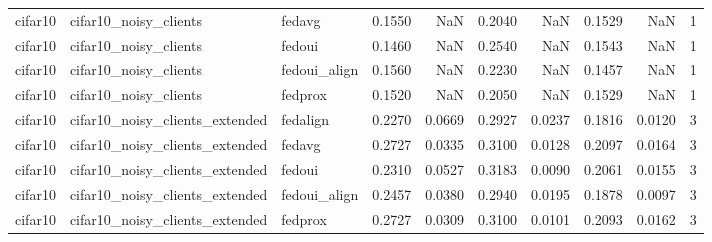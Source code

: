 \begin{tabular}{lllrrrrrrr}
cifar10 & cifar10_noisy_clients & fedavg & 0.1550 & NaN & 0.2040 & NaN & 0.1529 & NaN & 1 \\
cifar10 & cifar10_noisy_clients & fedoui & 0.1460 & NaN & 0.2540 & NaN & 0.1543 & NaN & 1 \\
cifar10 & cifar10_noisy_clients & fedoui_align & 0.1560 & NaN & 0.2230 & NaN & 0.1457 & NaN & 1 \\
cifar10 & cifar10_noisy_clients & fedprox & 0.1520 & NaN & 0.2050 & NaN & 0.1529 & NaN & 1 \\
cifar10 & cifar10_noisy_clients_extended & fedalign & 0.2270 & 0.0669 & 0.2927 & 0.0237 & 0.1816 & 0.0120 & 3 \\
cifar10 & cifar10_noisy_clients_extended & fedavg & 0.2727 & 0.0335 & 0.3100 & 0.0128 & 0.2097 & 0.0164 & 3 \\
cifar10 & cifar10_noisy_clients_extended & fedoui & 0.2310 & 0.0527 & 0.3183 & 0.0090 & 0.2061 & 0.0155 & 3 \\
cifar10 & cifar10_noisy_clients_extended & fedoui_align & 0.2457 & 0.0380 & 0.2940 & 0.0195 & 0.1878 & 0.0097 & 3 \\
cifar10 & cifar10_noisy_clients_extended & fedprox & 0.2727 & 0.0309 & 0.3100 & 0.0101 & 0.2093 & 0.0162 & 3 \\
\bottomrule
\end{tabular}
